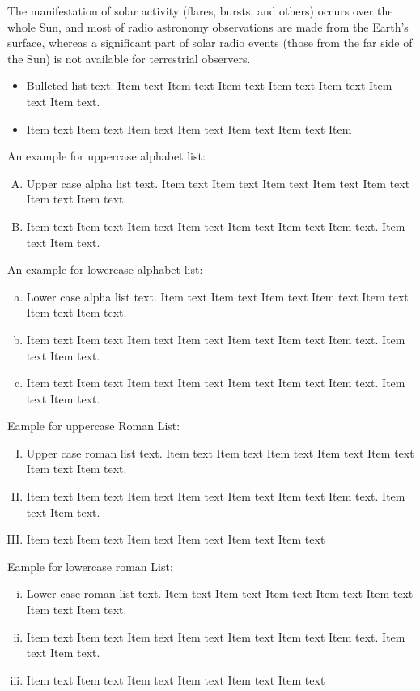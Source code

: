 The manifestation of solar activity (flares, bursts, and others) occurs over the whole Sun, and most of radio astronomy observations are made from the Earth's surface, whereas a significant part of solar radio events (those from the far side of the Sun) is not available for terrestrial observers.
\begin{itemize}
\item Bulleted list text. Item text  Item text  Item text  Item text  Item text
Item text  Item text.
\item Item text  Item text  Item text  Item text  Item text  Item text  Item
\end{itemize}

An example for uppercase alphabet list:
\begin{enumerate}[A.]
\item Upper case alpha list text. Item text  Item text  Item text  Item text
Item text Item text  Item text.
\item Item text  Item text  Item text  Item text  Item text  Item text  Item
 text. Item text  Item text.
\end{enumerate}

An example for lowercase alphabet list:
\begin{enumerate}[a.]
\item Lower case alpha list text. Item text  Item text  Item text  Item text  Item text
Item text  Item text.
\item Item text  Item text  Item text  Item text  Item text  Item text  Item text. Item text  Item text.
\item Item text  Item text  Item text  Item text  Item text  Item text  Item
text. Item text  Item text.
\end{enumerate}

\clearpage

Eample for uppercase Roman List:
\begin{enumerate}[I.]
\item Upper case roman list text. Item text  Item text  Item text  Item
text  Item text Item text  Item text.
\item Item text  Item text  Item text  Item text  Item text  Item text
Item text. Item text  Item text.
\item Item text  Item text  Item text  Item text  Item text  Item text
\end{enumerate}

Eample for lowercase roman List:
\begin{enumerate}[i.]
\item Lower case roman list text. Item text  Item text  Item text  Item
text  Item text Item text  Item text.
\item Item text  Item text  Item text  Item text  Item text  Item text
Item text. Item text  Item text.
\item Item text  Item text  Item text  Item text  Item text  Item text
\end{enumerate}

